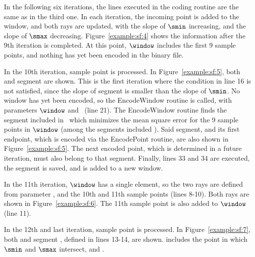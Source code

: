 \clearpage


In the following six iterations, the lines executed in the coding routine are the same as in the third one. In each iteration, the incoming point is added to the window, and both rays are updated, with the slope of $\smin$ increasing, and the slope of $\smax$ decreasing. Figure~\ref{example:sf:4} shows the information after the 9th iteration is completed. At this point, $\window$ includes the first 9 sample points, and nothing has yet been encoded in the binary file. 




In the 10th iteration, sample point  is processed. In Figure~\ref{example:sf:5}, both  and segment  are shown. This is the first iteration where the condition in line 16 is not satisfied, since the slope of segment  is smaller than the slope of $\smin$. No window has yet been encoded, so the EncodeWindow routine is called, with parameters $\window$ and \segmentSet\ (line 21). The EncodeWindow routine finds the segment included in \segmentSet\ which minimizes the mean square error for the 9 sample points in $\window$ (among the segments included \segmentSet). Said segment, and its first endpoint, which is encoded via the EncodePoint routine, are also shown in Figure~\ref{example:sf:5}. The next encoded point, which is determined in a future iteration, must also belong to that segment. Finally, lines 33 and 34 are executed, the segment is saved, and  is added to a new window.




\clearpage


In the 11th iteration, $\window$ has a single element, so the two rays are defined from parameter \maxerror, and the 10th and 11th sample points (lines 8-10). Both rays are shown in Figure~\ref{example:sf:6}. The 11th sample point is also added to $\window$ (line 11).




In the 12th and last iteration, sample point  is processed. In Figure~\ref{example:sf:7}, both  and segment , defined in lines 13-14, are shown.  includes the point in which $\smin$ and $\smax$ intersect, and .




